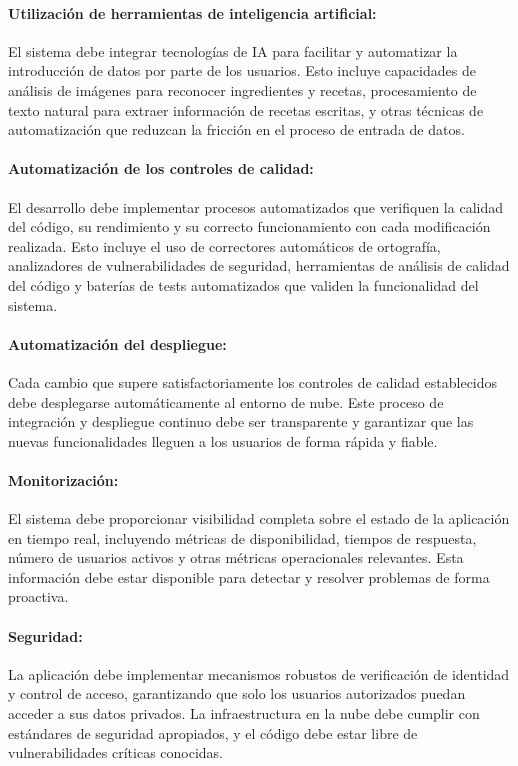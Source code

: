 \paragraph{Utilización de herramientas de inteligencia artificial:}
El sistema debe integrar tecnologías de IA para facilitar y automatizar la introducción de datos por parte de los usuarios. Esto incluye capacidades de análisis de imágenes para reconocer ingredientes y recetas, procesamiento de texto natural para extraer información de recetas escritas, y otras técnicas de automatización que reduzcan la fricción en el proceso de entrada de datos.

\paragraph{Automatización de los controles de calidad:}
El desarrollo debe implementar procesos automatizados que verifiquen la calidad del código, su rendimiento y su correcto funcionamiento con cada modificación realizada. Esto incluye el uso de correctores automáticos de ortografía, analizadores de vulnerabilidades de seguridad, herramientas de análisis de calidad del código y baterías de tests automatizados que validen la funcionalidad del sistema.

\paragraph{Automatización del despliegue:}
Cada cambio que supere satisfactoriamente los controles de calidad establecidos debe desplegarse automáticamente al entorno de nube. Este proceso de integración y despliegue continuo debe ser transparente y garantizar que las nuevas funcionalidades lleguen a los usuarios de forma rápida y fiable.

\paragraph{Monitorización:}
El sistema debe proporcionar visibilidad completa sobre el estado de la aplicación en tiempo real, incluyendo métricas de disponibilidad, tiempos de respuesta, número de usuarios activos y otras métricas operacionales relevantes. Esta información debe estar disponible para detectar y resolver problemas de forma proactiva.

\paragraph{Seguridad:}
La aplicación debe implementar mecanismos robustos de verificación de identidad y control de acceso, garantizando que solo los usuarios autorizados puedan acceder a sus datos privados. La infraestructura en la nube debe cumplir con estándares de seguridad apropiados, y el código debe estar libre de vulnerabilidades críticas conocidas.

